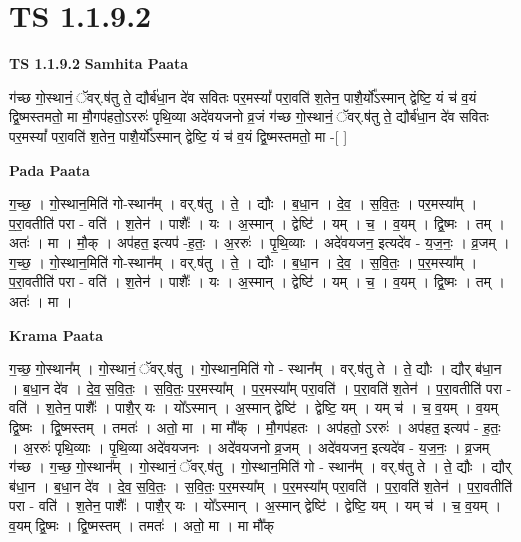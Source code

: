 \documentclass[17pt]{extarticle}
\begin{document}
\section*{ TS 1.1.9.2 }

\textbf{TS 1.1.9.2 } \newline
\textbf{Samhita Paata} \newline

ग॑च्छ गो॒स्थानं॒ ॅवर्.ष॑तु ते॒ द्यौर्ब॑धा॒न दे॑व सवितः पर॒मस्यां᳚ परा॒वति॑ श॒तेन॒ पाशै॒र्यो᳚ऽस्मान् द्वेष्टि॒ यं च॑ व॒यं द्वि॒ष्मस्तमतो॒ मा मौ॒गप॑हतो॒ऽररुः॑ पृथि॒व्या अदे॑वयजनो व्र॒जं ग॑च्छ गो॒स्थानं॒ ॅवर्.ष॑तु ते॒ द्यौर्ब॑धा॒न दे॑व सवितः पर॒मस्यां᳚ परा॒वति॑ श॒तेन॒ पाशै॒र्यो᳚ऽस्मान् द्वेष्टि॒ यं च॑ व॒यं द्वि॒ष्मस्तमतो॒ मा -[ ] \newline

\textbf{Pada Paata} \newline

ग॒च्छ॒ । गो॒स्थान॒मिति॑ गो-स्थान᳚म् । वर्.ष॑तु । ते॒ । द्यौः । ब॒धा॒न । दे॒व॒ । स॒वि॒तः॒ । पर॒मस्या᳚म् । प॒रा॒वतीति॑ परा - वति॑ । श॒तेन॑ । पाशैः᳚ । यः । अ॒स्मान् । द्वेष्टि॑ । यम् । च॒ । व॒यम् । द्वि॒ष्मः । तम् । अतः॑ । मा । मौ॒क् । अप॑हत॒ इत्यप॑ -ह॒तः॒ । अ॒ररुः॑ । पृ॒थि॒व्याः । अदे॑वयजन॒ इत्यदे॑व - य॒ज॒नः॒ । व्र॒जम् । ग॒च्छ॒ । गो॒स्थान॒मिति॑ गो-स्थान᳚म् । वर्.ष॑तु । ते॒ । द्यौः । ब॒धा॒न । दे॒व॒ । स॒वि॒तः॒ । प॒र॒मस्या᳚म् । प॒रा॒वतीति॑ परा - वति॑ । श॒तेन॑ । पाशैः᳚ । यः । अ॒स्मान् । द्वेष्टि॑ । यम् । च॒ । व॒यम् । द्वि॒ष्मः । तम् । अतः॑ । मा ।  \newline


\textbf{Krama Paata} \newline

ग॒च्छ॒ गो॒स्थान᳚म् । गो॒स्थानं॒ ॅवर्.ष॑तु । गो॒स्थान॒मिति॑ गो - स्थान᳚म् । वर्.ष॑तु ते । ते॒ द्यौः । द्यौर् ब॑धा॒न । ब॒धा॒न दे॑व । दे॒व॒ स॒वि॒तः॒ । स॒वि॒तः॒ प॒र॒मस्या᳚म् । प॒र॒मस्या᳚म् परा॒वति॑ । प॒रा॒वति॑ श॒तेन॑ । प॒रा॒वतीति॑ परा - वति॑ । श॒तेन॒ पाशैः᳚ । पाशै॒र् यः । यो᳚ऽस्मान् । अ॒स्मान् द्वेष्टि॑ । द्वेष्टि॒ यम् । यम् च॑ । च॒ व॒यम् । व॒यम् द्वि॒ष्मः । द्वि॒ष्मस्तम् । तमतः॑ । अतो॒ मा । मा मौ᳚क् । मौ॒गप॑हतः । अप॑हतो॒ ऽररुः॑ । अप॑हत॒ इत्यप॑ - ह॒तः॒ । अ॒ररुः॑ पृथि॒व्याः । पृ॒थि॒व्या अदे॑वयजनः । अदे॑वयजनो व्र॒जम् । अदे॑वयजन॒ इत्यदे॑व - य॒ज॒नः॒ । व्र॒जम् ग॑च्छ । ग॒च्छ॒ गो॒स्थान᳚म् । गो॒स्थानं॒ ॅवर्.ष॑तु । गो॒स्थान॒मिति॑ गो - स्थान᳚म् । वर्.ष॑तु ते । ते॒ द्यौः । द्यौर् ब॑धा॒न । ब॒धा॒न दे॑व । दे॒व॒ स॒वि॒तः॒ । स॒वि॒तः॒ प॒र॒मस्या᳚म् । प॒र॒मस्या᳚म् परा॒वति॑ । प॒रा॒वति॑ श॒तेन॑ । प॒रा॒वतीति॑ परा - वति॑ । श॒तेन॒ पाशैः᳚ । पाशै॒र् यः । यो᳚ऽस्मान् । अ॒स्मान् द्वेष्टि॑ । द्वेष्टि॒ यम् । यम् च॑ । च॒ व॒यम् । व॒यम् द्वि॒ष्मः । द्वि॒ष्मस्तम् । तमतः॑ । अतो॒ मा । मा मौ᳚क् \newline
\end{document}
